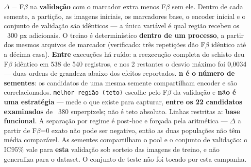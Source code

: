 \footnotesize $\Delta$ = F$\beta$ na \textbf{validação} com o marcador extra menos F$\beta$ sem ele. Dentro de cada semente, a partição, as imagens iniciais, os marcadores base, o encoder inicial e o conjunto de validação são idênticos --- a única variável é qual região recebeu os ~300 px adicionais. O treino é determinístico \textbf{dentro de um processo}, a partir dos mesmos arquivos de marcador (verificado: três repetições dão F$\beta$ idêntico até a décima casa). \textbf{Entre} execuções há ruído: a reexecução completa do schisto deu F$\beta$ idêntico em 538 de 540 registros, e nos 2 restantes o desvio máximo foi 0,0034 --- duas ordens de grandeza abaixo dos efeitos reportados. \textbf{n é o número de sementes}: os candidatos de uma mesma semente compartilham encoder e são correlacionados. \texttt{melhor região (teto)} escolhe pelo F$\beta$ da validação e \textbf{não é uma estratégia} --- mede o que existe para capturar, \textbf{entre os 22 candidatos examinados} de ~380 superpixels; não é teto absoluto. Linhas restritas a: \textbf{base funcional}. A separação por regime é post-hoc e forçada pela aritmética --- $\Delta$ a partir de F$\beta$=0 exato não pode ser negativo, então as duas populações não têm média comparável. As sementes compartilham o pool e o conjunto de validação: o IC95\% vale para \textbf{esta} validação sob sorteio das imagens de treino, e não generaliza para o dataset. O conjunto de teste não foi tocado por esta campanha.
\normalsize
